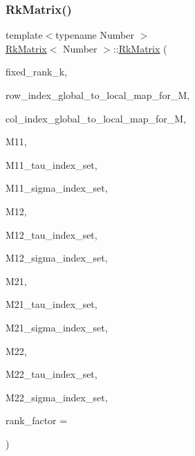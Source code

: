\subsubsection{\texorpdfstring{Rk\+Matrix()}{RkMatrix()}\hspace{0.1cm}{\footnotesize\ttfamily [18/19]}}
{\footnotesize\ttfamily template$<$typename Number $>$ \\
\hyperlink{classRkMatrix}{Rk\+Matrix}$<$ Number $>$\+::\hyperlink{classRkMatrix}{Rk\+Matrix} (\begin{DoxyParamCaption}\item[{const \hyperlink{classRkMatrix_add060bfc3a4cc77f858c3d6dd58cadd5}{size\+\_\+type}}]{fixed\+\_\+rank\+\_\+k,  }\item[{const std\+::map$<$ types\+::global\+\_\+dof\+\_\+index, size\+\_\+t $>$ \&}]{row\+\_\+index\+\_\+global\+\_\+to\+\_\+local\+\_\+map\+\_\+for\+\_\+M,  }\item[{const std\+::map$<$ types\+::global\+\_\+dof\+\_\+index, size\+\_\+t $>$ \&}]{col\+\_\+index\+\_\+global\+\_\+to\+\_\+local\+\_\+map\+\_\+for\+\_\+M,  }\item[{const \hyperlink{classRkMatrix}{Rk\+Matrix}$<$ Number $>$ \&}]{M11,  }\item[{const std\+::vector$<$ types\+::global\+\_\+dof\+\_\+index $>$ \&}]{M11\+\_\+tau\+\_\+index\+\_\+set,  }\item[{const std\+::vector$<$ types\+::global\+\_\+dof\+\_\+index $>$ \&}]{M11\+\_\+sigma\+\_\+index\+\_\+set,  }\item[{const \hyperlink{classRkMatrix}{Rk\+Matrix}$<$ Number $>$ \&}]{M12,  }\item[{const std\+::vector$<$ types\+::global\+\_\+dof\+\_\+index $>$ \&}]{M12\+\_\+tau\+\_\+index\+\_\+set,  }\item[{const std\+::vector$<$ types\+::global\+\_\+dof\+\_\+index $>$ \&}]{M12\+\_\+sigma\+\_\+index\+\_\+set,  }\item[{const \hyperlink{classRkMatrix}{Rk\+Matrix}$<$ Number $>$ \&}]{M21,  }\item[{const std\+::vector$<$ types\+::global\+\_\+dof\+\_\+index $>$ \&}]{M21\+\_\+tau\+\_\+index\+\_\+set,  }\item[{const std\+::vector$<$ types\+::global\+\_\+dof\+\_\+index $>$ \&}]{M21\+\_\+sigma\+\_\+index\+\_\+set,  }\item[{const \hyperlink{classRkMatrix}{Rk\+Matrix}$<$ Number $>$ \&}]{M22,  }\item[{const std\+::vector$<$ types\+::global\+\_\+dof\+\_\+index $>$ \&}]{M22\+\_\+tau\+\_\+index\+\_\+set,  }\item[{const std\+::vector$<$ types\+::global\+\_\+dof\+\_\+index $>$ \&}]{M22\+\_\+sigma\+\_\+index\+\_\+set,  }\item[{const Number}]{rank\+\_\+factor = {} }\end{DoxyParamCaption})}


